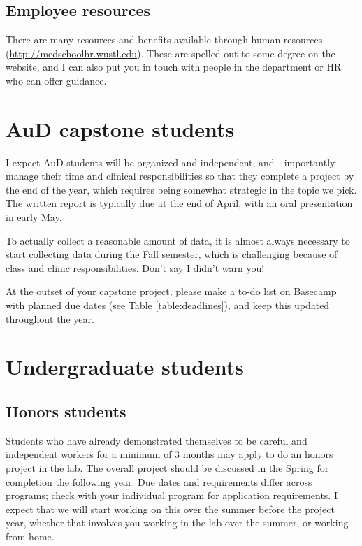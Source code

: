 \documentclass[letterpaper,12pt,oneside]{memoir}
\begin{document}
\subsection{Employee resources}

There are many resources and benefits available through human resources (\url{http://medschoolhr.wustl.edu}). These are spelled out to some degree on the website, and I can also put you in touch with people in the department or HR who can offer guidance.


\section{AuD capstone students}
I expect AuD students will be organized and independent, and---importantly---manage their time and clinical responsibilities so that they complete a project by the end of the year, which requires being somewhat strategic in the topic we pick. The written report is typically due at the end of April, with an oral presentation in early May.

To actually collect a reasonable amount of data, it is almost always necessary to start collecting data during the Fall semester, which is challenging because of class and clinic responsibilities. Don't say I didn't warn you!

At the outset of your capstone project, please make a to-do list on Basecamp with planned due dates (see Table \ref{table:deadlines}), and keep this updated throughout the year.

\section{Undergraduate students}

\subsection{Honors students}

Students who have already demonstrated themselves to be careful and independent workers for a minimum of 3 months may apply to do an honors project in the lab. The overall project should be discussed in the Spring for completion the following year. Due dates and requirements differ across programs; check with your individual program for application requirements. I expect that we will start working on this over the summer before the project year, whether that involves you working in the lab over the summer, or working from home.
\end{document}
